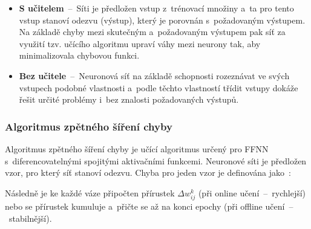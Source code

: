 \documentclass[a4paper,12pt]{article}
\begin{document}
{{{{{{{{\begin{itemize}
\item \textbf{S učitelem}~--~Síti je předložen vstup z~trénovací množiny a~ta pro tento vstup stanoví odezvu (výstup), který je porovnán s~požadovaným výstupem. Na základě chyby mezi skutečným a~požadovaným výstupem pak síť za využití tzv. učícího algoritmu upraví váhy mezi neurony tak, aby minimalizovala chybovou funkci.

\item \textbf{Bez učitele}~--~Neuronová síť na základě schopnosti rozeznávat ve svých vstupech podobné vlastnosti a~podle těchto vlastností třídit vstupy dokáže řešit určité problémy i~bez znalosti požadovaných výstupů.~\cite{nn}
\end{itemize}

\subsubsection{Algoritmus zpětného šíření chyby}

Algoritmus zpětného šíření chyby je učící algoritmus určený pro FFNN s~diferencovatelnými spojitými aktivačními funkcemi. Neuronové síti je předložen vzor, pro který síť stanoví odezvu. Chyba pro jeden vzor je definována jako~\cite{nn}:


Následně je ke každé váze připočten přírustek $\Delta w_{ij}^k$ (při online učení~--~rychlejší) nebo se přírustek kumuluje a~přičte se až na konci epochy (při offline učení~--~stabilnější).~\cite{nn}


}}}}}}}}
\end{document}
